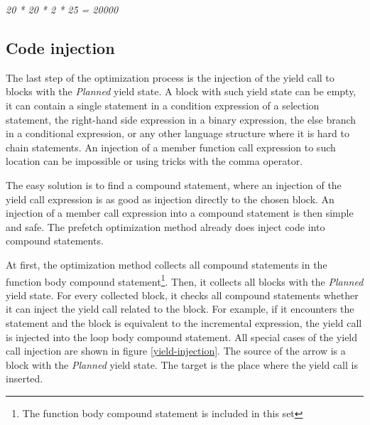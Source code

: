\begin{center}
\emph{20 * 20 * 2 * 25 = 20000}
\end{center}

\subsection{Code injection}
The last step of the optimization process is the injection of the yield call to blocks with the \emph{Planned} yield state. A block with such yield state can be empty, it can contain a single statement in a condition expression of a selection statement, the right-hand side expression in a binary expression, the else branch in a conditional expression, or any other language structure where it is hard to chain statements. An injection of a member function call expression to such location can be impossible or using tricks with the comma operator.

The easy solution is to find a compound statement, where an injection of the yield call expression is as good as injection directly to the chosen block. An injection of a member call expression into a compound statement is then simple and safe. The prefetch optimization method already does inject code into compound statements.

At first, the optimization method collects all compound statements in the function body compound statement\footnote{The function body compound statement is included in this set}. Then, it collects all blocks with the \emph{Planned} yield state. For every collected block, it checks all compound statements whether it can inject the yield call related to the block. For example, if it encounters the  statement and the block is equivalent to the incremental expression, the yield call is injected into the loop body compound statement. All special cases of the yield call injection are shown in figure \ref{yield-injection}. The source of the arrow is a block with the \emph{Planned} yield state. The target is the place where the yield call is inserted.

